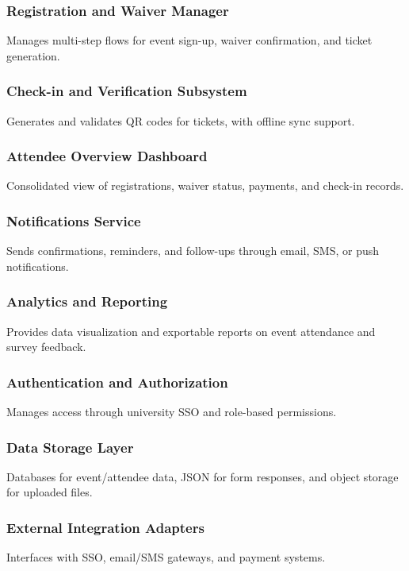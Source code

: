 \documentclass{article}
\begin{document}
\subsubsection{Registration and Waiver Manager}
Manages multi-step flows for event sign-up, waiver confirmation, and ticket generation.

\subsubsection{Check-in and Verification Subsystem}
Generates and validates QR codes for tickets, with offline sync support.

\subsubsection{Attendee Overview Dashboard}
Consolidated view of registrations, waiver status, payments, and check-in records.

\subsubsection{Notifications Service}
Sends confirmations, reminders, and follow-ups through email, SMS, or push notifications.

\subsubsection{Analytics and Reporting}
Provides data visualization and exportable reports on event attendance and survey feedback.

\subsubsection{Authentication and Authorization}
Manages access through university SSO and role-based permissions.

\subsubsection{Data Storage Layer}
Databases for event/attendee data, JSON for form responses, and object storage for uploaded files.

\subsubsection{External Integration Adapters}
Interfaces with SSO, email/SMS gateways, and payment systems.
\end{document}
